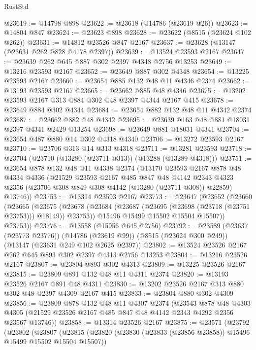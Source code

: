 \begin{lexlean}{RustStd}
\begin{coremodule}
@23619 := @14798 @898
@23622 := @23618 (@14786 (@23619 @26))
@23623 := @14804 @847
@23624 := @23623 @898
@23628 := @23622 (@8515 (@23624 @102 @262))
@23631 := @14812 @23526 @847 @2167
@23637 := @23628 (@13147 (@23631 @262 @828 @4178 @2397))
@23639 := @13524 @23593 @2167
@23647 := @23639 @262 @645 @887 @302 @2397 @4348 @2756 @13253
@23649 := @13216 @23593 @2167
@23652 := @23649 @887 @302 @4348
@23654 := @13225 @23593 @2167
@23660 := @23654 @885 @132 @48 @11 @4346 @2374
@23662 := @13193 @23593 @2167
@23665 := @23662 @885 @48 @4346
@23675 := @13202 @23593 @2167 @313 @884 @302 @48 @2397 @4344 @2167 @415
@23678 := @23649 @884 @302 @4344
@23684 := @23654 @882 @132 @48 @11 @4342 @2374
@23687 := @23662 @882 @48 @4342
@23695 := @23639 @163 @48 @881 @18031 @2397 @4341 @2429 @13254
@23698 := @23649 @881 @18031 @4341
@23704 := @23654 @487 @880 @14 @302 @4318 @4340
@23706 := @13272 @23593 @2167
@23710 := @23706 @313 @14 @313 @4318
@23711 := @13281 @23593
@23718 := @23704 (@23710 (@13280 (@23711 @313)) (@13288 (@13289 @4318)))
@23751 := @23654
    @878
    @132
    @48
    @11
    @4338
    @2374
    (@13170
      @23593
      @2167
      @878
      @48
      @4334
      @4336
      (@21529
        @23593
        @2167
        @485
        @847
        @48
        @4142
        @2343
        @4323
        @2356
        (@23706 @308 @849 @308 @4142 (@13280 (@23711 @308)) @22859)
        @13746))
@23753 := @13314 @23593 @2167
@23773 := @23647
    (@23652
      (@23660
        (@23665
          (@23675
            (@23678 (@23684 (@23687 (@23695 (@23698 (@23718 (@23751 @23753))) @18149)) @23753))
            @15496
            @15499
            @15502
            @15504
            @15507))
        @23753))
@23776 := @13558 (@15956 @645 @2756)
@23792 := @23589
    (@23637 (@23773 @23776))
    (@14786 (@23619 @99))
    (@8515 (@23624 @300 @249))
    (@13147 (@23631 @249 @102 @2625 @2397))
@23802 := @13524 @23526 @2167 @262 @645 @893 @302 @2397 @4313 @2756 @13253
@23804 := @13216 @23526 @2167
@23807 := @23804 @893 @302 @4313
@23809 := @13225 @23526 @2167
@23815 := @23809 @891 @132 @48 @11 @4311 @2374
@23820 := @13193 @23526 @2167 @891 @48 @4311
@23830 := @13202 @23526 @2167 @313 @880 @302 @48 @2397 @4309 @2167 @415
@23833 := @23804 @880 @302 @4309
@23856 := @23809
    @878
    @132
    @48
    @11
    @4307
    @2374
    (@23543
      @878
      @48
      @4303
      @4305
      (@21529 @23526 @2167 @485 @847 @48 @4142 @2343 @4292 @2356 @23567 @13746))
@23858 := @13314 @23526 @2167
@23875 := @23571
    (@23792
      (@23802
        (@23807
          (@23815
            (@23820 (@23830 (@23833 (@23856 @23858)) @15496 @15499 @15502 @15504 @15507))

\end{coremodule}
\end{lexlean}
